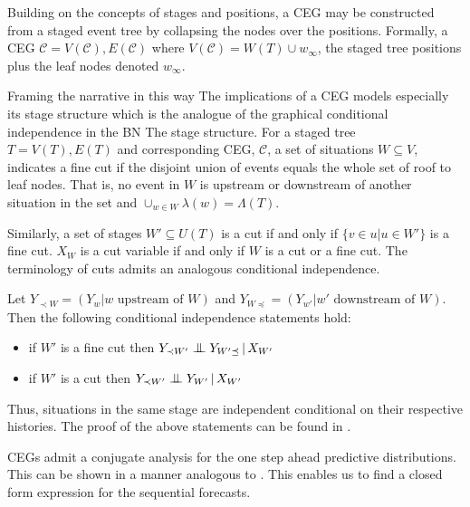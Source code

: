 \documentclass[12pt]{article}
\newcommand{\bigCI}{\mathrel{\text{\scalebox{1.07}{$\perp\mkern-10mu\perp$}}}}
\begin{document}
Building on the concepts of stages and positions, a CEG may be constructed from a staged event tree by collapsing the nodes over the positions. Formally, a CEG $\mathcal{C} = V(\mathcal{C}), E(\mathcal{C})$ where $V(\mathcal{C}) = W(T) \cup w_\infty$, the staged tree positions plus the leaf nodes denoted $w_\infty$. 



Framing the narrative in this way The implications of a CEG models especially its stage structure which
is the analogue of the graphical conditional independence in the BN
\cite{Dawid 1979} \cite{Studen 2005} %
The stage structure. For a staged tree $T = V(T), E(T)$ and corresponding CEG, $\mathcal{C}$, a set of situations $W \subseteq V$, indicates a fine cut if the disjoint union of events equals the whole set of roof to leaf nodes. That is, no event in $W$ is upstream or downstream of another situation in the set and $\cup_{w \in W} \lambda(w) = \Lambda (T)$.

Similarly, a set of stages $W' \subseteq U(T)$ is a cut if and only if $\{ v \in u | u \in W'\} $ is a fine cut. $X_W$ is a cut variable if and only if  $W$ is a cut or a fine cut. The terminology of cuts admits an analogous conditional independence. 

Let $Y_{\prec W} = (Y_w | w \text{ upstream of } W)$ and $ Y_{W\preceq} = (Y_{w'}  | w' \text{ downstream of } W) $. Then the following conditional independence statements hold:  

\begin{itemize}
	\item if $W'$ is a fine cut then $Y_{\prec W'} \bigCI Y_{W'\preceq} \,|\, X_{W'}$ 
	\item if $W'$ is a cut then $Y_{\prec W'} \bigCI Y_{W'} \,|\, X_{W'}$ 
\end{itemize}

Thus, situations in the same stage are independent conditional on their respective histories. The proof of the above statements can be found in \cite{SmithAnderson} \cite{ThwaitesSmith}. %
  
CEGs admit a conjugate analysis for the one step ahead predictive distributions. This can be shown in a manner analogous to \cite{Freeman and Smith 2011}. This enables us to find a closed form expression for the sequential forecasts. 
\end{document}
